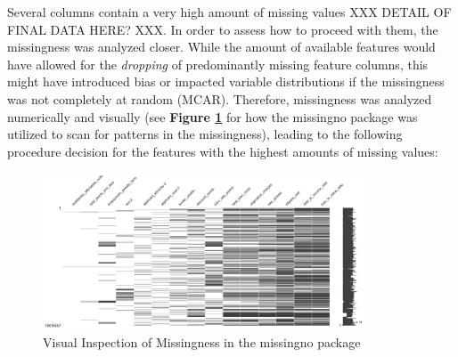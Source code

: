 Several columns contain a very high amount of missing values XXX DETAIL OF FINAL DATA HERE? XXX. In order to assess how to proceed with them, the missingness was analyzed closer. While the amount of available features would have allowed for the \textit{dropping} of predominantly missing feature columns, this might have introduced bias or impacted variable distributions if the missingness was not completely at random (MCAR).
Therefore, missingness was analyzed numerically and visually (see \textbf{Figure \ref{fig:CH03_OLD!_Missingno_Completeness}} for how the missingno package was utilized to scan for patterns in the missingness), leading to the following procedure decision for the features with the highest amounts of missing values:

\begin{figure}[h]
    \centering
    \includegraphics[width=0.85\textwidth]{images/CH03_OLD!_Missingno_Completeness.png}
    \caption{Visual Inspection of Missingness in the missingno package}
    \label{fig:CH03_OLD!_Missingno_Completeness}
\end{figure}

